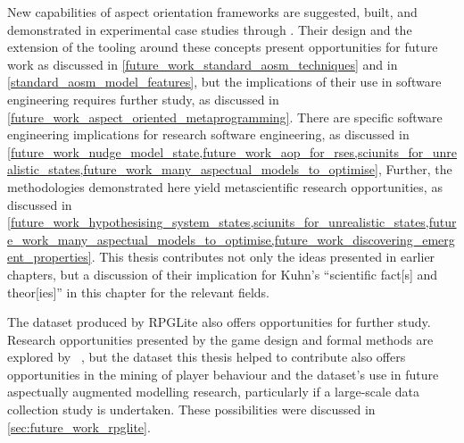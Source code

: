 New capabilities of aspect orientation frameworks are suggested, built, and
demonstrated in experimental case studies through \pdsfthree{}. Their design and the
extension of the tooling around these concepts present opportunities for future
work as discussed in \cref{future_work_standard_aosm_techniques} and in
\cref{standard_aosm_model_features}, but the implications of their use in
software engineering requires further study, as discussed in
\cref{future_work_aspect_oriented_metaprogramming}. There are specific software
engineering implications for research software engineering, as discussed in
\cref{future_work_nudge_model_state,future_work_aop_for_rses,sciunits_for_unrealistic_states,future_work_many_aspectual_models_to_optimise},
Further, the methodologies demonstrated here yield metascientific research
opportunities, as discussed in
\cref{future_work_hypothesising_system_states,sciunits_for_unrealistic_states,future_work_many_aspectual_models_to_optimise,future_work_discovering_emergent_properties}.
This thesis contributes not only the ideas presented in earlier chapters, but a
discussion of their implication for Kuhn's ``scientific fact[s] and theor[ies]''
in this chapter for the relevant fields.


The dataset produced by RPGLite also offers opportunities for further study.
Research opportunities presented by the game design and formal methods are
explored by \citeauthor{kavanagh2021thesis}~\cite{kavanagh2021thesis}, but the
dataset this thesis helped to contribute also offers opportunities in the
mining of player behaviour and the dataset's use in future aspectually
augmented modelling research, particularly if a large-scale data collection
study is undertaken. These possibilities were discussed in
\cref{sec:future_work_rpglite}.


